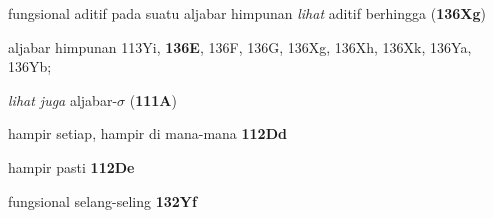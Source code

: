 











































fungsional aditif pada suatu aljabar himpunan {\it lihat} aditif berhingga
({\bf 136Xg})
































aljabar himpunan 113Yi, {\bf 136E}, 136F, 136G, 136Xg, 136Xh,
136Xk, 136Ya, 136Yb;  

  {\it lihat juga }
aljabar-$\sigma$ ({\bf 111A})













hampir setiap, hampir di mana-mana {\bf 112Dd}








hampir pasti {\bf 112De}

fungsional selang-seling {\bf 132Yf}
















